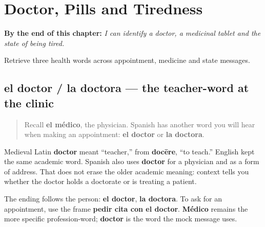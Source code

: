 
\chapter{Doctor, Pills and Tiredness}
\label{ch:doctor-pastilla-cansado}

\begin{chapteropening}
\textbf{By the end of this chapter:} \emph{I can identify a doctor, a medicinal tablet and the state of being tired.}

Retrieve three health words across appointment, medicine and state messages.
\end{chapteropening}

\section[el doctor / la doctora]{el doctor / la doctora — the teacher-word at the clinic}

\label{lesson:ES-C408-doctor}



\begin{quote}
Recall \textbf{el médico}, the physician. Spanish has another word you will hear when making an appointment: \textbf{el doctor} or \textbf{la doctora}.
\end{quote}

\begin{cousinweb}
Medieval Latin \textbf{doctor} meant “teacher,” from \textbf{docēre}, “to teach.” English kept the same academic word. Spanish also uses \textbf{doctor} for a physician and as a form of address. That does not erase the older academic meaning: context tells you whether the doctor holds a doctorate or is treating a patient.
\end{cousinweb}

\begin{grammarlens}[title={Grammar Lens: name the person}]
The ending follows the person: \textbf{el doctor}, \textbf{la doctora}. To ask for an appointment, use the frame \textbf{pedir cita con el doctor}. \textbf{Médico} remains the more specific profession-word; \textbf{doctor} is the word the mock message uses.
\end{grammarlens}

